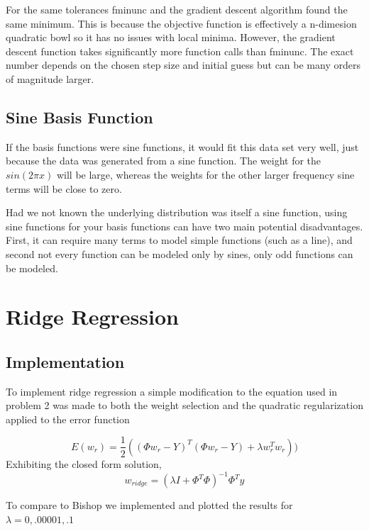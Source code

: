 \documentclass[10pt,twocolumn]{article}
\begin{document}
For the same tolerances fminunc and the gradient descent algorithm found the same minimum. This is because the objective function is effectively a n-dimesion quadratic bowl so it has no issues with local minima. However, the gradient descent function takes significantly more function calls than fminunc. The exact number depends on the chosen step size and initial guess but can be many orders of magnitude larger. 

\subsection*{ Sine Basis Function}
If the basis functions were sine functions, it would fit this data set very well, just because the data was generated from a sine function. The weight for the $sin(2 \pi x)$ will be large, whereas the weights for the other larger frequency sine terms will be close to zero.

Had we not known the underlying distribution was itself a sine function, using sine functions for your basis functions can have two main potential disadvantages. First, it can require many terms to model simple functions (such as a line), and second not every function can be modeled only by sines, only odd functions can be modeled.

\section{Ridge Regression}

\subsection*{ Implementation}

To implement ridge regression a simple modification to the equation used in problem 2 was made to both the weight selection and the quadratic regularization applied to the error function 

\begin{equation}
E(w_{r}) = \frac{1}{2}((\Phi w_{r}  -Y)^T( \Phi w_{r}  -Y) + \lambda w_{r}^T w_{r}))
\end{equation}
Exhibiting the closed form solution, 
\begin{equation}
w_{ridge} = (\lambda I + \Phi^T  \Phi)^{-1}  \Phi^T y
\end{equation}

To compare to Bishop we implemented and plotted the results for $\lambda = {0, .00001, .1} $
\end{document}
